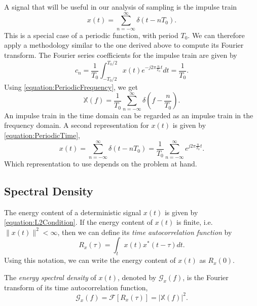 A signal that will be useful in our analysis of sampling is the impulse train
\begin{equation*}
x(t) = \sum_{n = -\infty}^{\infty} \delta(t - nT_0) .
\end{equation*}
This is a special case of a periodic function, with period $T_0$.
We can therefore apply a methodology similar to the one derived above to compute its Fourier transform.
The Fourier series coefficients for the impulse train are given by
\begin{equation*}
c_n = \frac{1}{T_0} \int_{-T_0/2}^{T_0/2} x(t) e^{- j 2 \pi \frac{n}{T_0} t} dt
= \frac{1}{T_0} .
\end{equation*}
Using \eqref{equation:PeriodicFrequency}, we get
\begin{equation} \label{equation:ImpulseTrainFrequency}
\mathbb{X}(f) = \frac{1}{T_0} \sum_{n = -\infty}^{\infty} \delta \left( f - \frac{n}{T_0} \right) .
\end{equation}
An impulse train in the time domain can be regarded as an impulse train in the frequency domain.
A second representation for $x(t)$ is given by \eqref{equation:PeriodicTime},
\begin{equation} \label{equation:ImpulseTrainTime}
x(t) = \sum_{n = -\infty}^{\infty} \delta(t - nT_0)
= \frac{1}{T_0} \sum_{n = -\infty}^{\infty} e^{j 2 \pi \frac{n}{T_0} t} .
\end{equation}
Which representation to use depends on the problem at hand.


\subsection{Spectral Density}
\label{subsection:SpectralDensity}

The energy content of a deterministic signal $x(t)$ is given by \eqref{equation:L2Condition}.
If the energy content of $x(t)$ is finite, i.e.\ $\| x(t) \|^2 < \infty$, then we can define its \emph{time autocorrelation function} by
\begin{equation*}
R_x(\tau) = \int_t x(t)x^*(t - \tau) dt .
\end{equation*}
Using this notation, we can write the energy content of $x(t)$ as $R_x(0)$.

\begin{definition}
The \emph{energy spectral density} of $x(t)$, denoted by $\mathcal{G}_x (f)$, is the Fourier transform of its time autocorrelation function,
\begin{equation*}
\mathcal{G}_x(f) = \mathcal{F} [ R_x (\tau) ] = | \mathbb{X}(f) |^2.
\end{equation*}
\end{definition}

